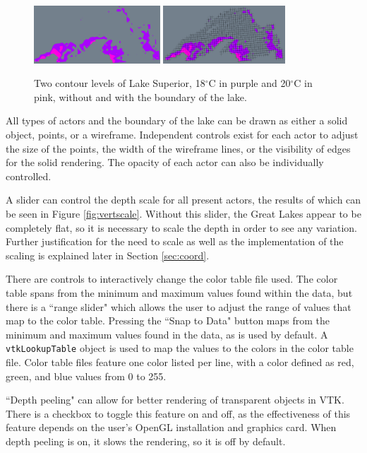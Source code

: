 \documentclass{article} %
\newcommand{\code}[1]{\texttt{#1}}
\begin{document}
\begin{figure}[htb]
   \centering
   \includegraphics[height=0.85in]{figures/lakewithoutframe.eps}
   \includegraphics[height=0.85in]{figures/lakewithframe.eps}
    \caption{Two contour levels of Lake Superior, 18$^\circ$C in purple and 20$^\circ$C in pink, without and with the boundary of the lake.}
   \label{fig:frame}
\end{figure}

All types of actors and the boundary of the lake can be drawn as either a solid object, points, or a wireframe.  Independent controls exist for each actor to adjust the size of the points, the width of the wireframe lines, or the visibility of edges for the solid rendering. The opacity of each actor can also be individually controlled.

A slider can control the depth scale for all present actors, the results of which can be seen in Figure \ref{fig:vertscale}.  Without this slider, the Great Lakes appear to be completely flat, so it is necessary to scale the depth in order to see any variation.  Further justification for the need to scale as well as the implementation of the scaling is explained later in Section \ref{sec:coord}.

There are controls to interactively change the color table file used.  The color table spans from the minimum and maximum values found within the data, but there is a ``range slider" which allows the user to adjust the range of values that map to the color table.  Pressing the ``Snap to Data" button maps from the minimum and maximum values found in the data, as is used by default. A \code{vtkLookupTable} object is used to map the values to the colors in the color table file.  Color table files feature one color listed per line, with a color defined as red, green, and blue values from 0 to 255.

``Depth peeling" can allow for better rendering of transparent objects in VTK.  There is a checkbox to toggle this feature on and off, as the effectiveness of this feature depends on the user's OpenGL installation and graphics card.  When depth peeling is on, it slows the rendering, so it is off by default.
\end{document}
